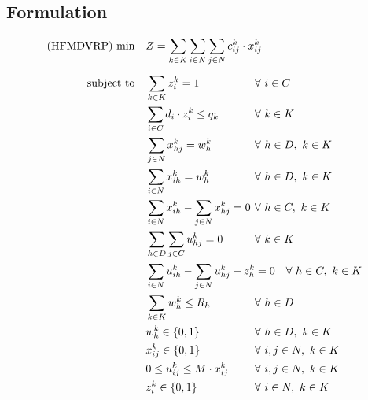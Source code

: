\documentclass[preprint,review,12pt]{elsarticle}
\begin{document}
\subsection{Formulation}

\begin{align}
    \text{(HFMDVRP) min} \quad        & Z = \sum\limits_{k\in K}\sum\limits_{i\in N}\sum\limits_{j\in N} c_{ij}^k \cdot x_{ij}^k    && \label{MDMVRP_FObj}    \\[5pt]
	\noindent \text{subject to} \quad & \sum\limits_{k \in K} z_{i}^k = 1  && \text{\hspace{-1cm}} \forall \ i \in C \label{MDMVRP_Service} \\
	& \sum\limits_{i \in C}d_i \cdot z_{i}^k \leq q_k               && \text{\hspace{-1cm}} \forall \ k \in K  \label{MDMVRP_Capacity} \\
	& \sum\limits_{j \in N}x_{hj}^k = w_h^k                                         && \text{\hspace{-1cm}} \forall \ h \in D,\ k \in K \label{MDMVRP_StartRoute} \\
	& \sum\limits_{i \in N}x_{ih}^k = w_h^k                                         && \text{\hspace{-1cm}} \forall \ h \in D,\ k \in K \label{MDMVRP_EndRoute} \\
	& \sum\limits_{i \in N}x_{ih}^k - \sum\limits_{j \in N}x_{hj}^k = 0             && \text{\hspace{-1cm}} \forall \ h \in C,\ k \in K \label{MDMVRP_Balance} \\
	& \sum\limits_{h \in D}\sum\limits_{j \in C}u_{hj}^k = 0 && \text{\hspace{-1cm}} \forall \ k \in K \label{MDVMRP_InitialU} \\
	& \sum\limits_{i \in N}u_{ih}^k - \sum\limits_{j \in N}u_{hj}^k + z_{h}^k = 0             && \text{\hspace{0cm}} \forall \ h \in C,\ k \in K \label{MDMVRP_Flow} \\
	& \sum\limits_{k \in K}w_h^k \leq R_h                                     && \text{\hspace{-1cm}} \forall \ h \in D \label{MDMVRP_CapacityD} \\
	& w_h^k \in\{0,1\}  && \text{\hspace{-1cm}} \forall \ h \in D, \ k \in K \label{MDVMRP_DomainW} \\
	& x_{ij}^k\in\{0,1\} && \text{\hspace{-1cm}} \forall \ i,j \in N,  \ k \in K \label{MDVMRP_DomainX} \\
	& 0 \leq u_{ij}^k \leq M \cdot x_{ij}^k && \text{\hspace{-1cm}} \forall \ i,j \in N,  \ k \in K \label{MDVMRP_DomainU} \\
	& z_{i}^k\in\{0,1\} && \text{\hspace{-1cm}} \forall \ i \in N,  \ k \in K \label{MDVMRP_DomainZ} 
\end{align}
\end{document}
